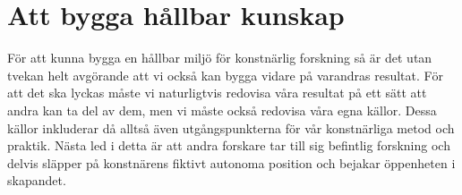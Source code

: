 \documentclass{article}
\begin{document}
\section{Att bygga hållbar kunskap}

För att kunna bygga en hållbar miljö för konstnärlig forskning så är det utan tvekan helt avgörande att vi också kan bygga vidare på varandras resultat. För att det ska lyckas måste vi naturligtvis redovisa våra resultat på ett sätt att andra kan ta del av dem, men vi måste också redovisa våra egna källor. Dessa källor inkluderar då alltså även utgångspunkterna för vår konstnärliga metod och praktik. Nästa led i detta är att andra forskare tar till sig befintlig forskning och delvis släpper på konstnärens fiktivt autonoma position och bejakar öppenheten i skapandet.

\end{document}
